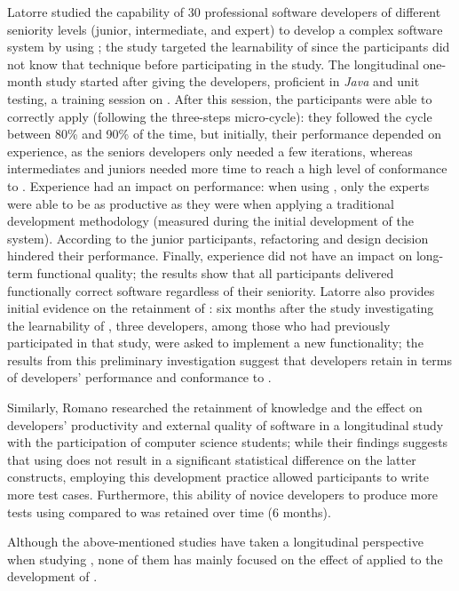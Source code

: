 Latorre \cite{DBLP:journals/tse/Latorre14} studied the capability of 30 professional software developers of different seniority levels (junior, intermediate, and expert) to develop a complex software system by using \tdd; the study targeted the learnability of \tdd since the participants did not know that technique before participating in the study. 
The longitudinal one-month study started after giving the developers, proficient in \textit{Java} and unit testing, a training session on \tdd. After this session, the participants were able to correctly apply \tdd (\eg following the three-steps micro-cycle): they followed the \tdd cycle between 80\% and 90\% of the time, but initially, their performance depended on experience, as the seniors developers only needed a few iterations, whereas intermediates and juniors needed more time to reach a high level of conformance to \tdd. 
Experience had an impact on performance: when using \tdd, only the experts were able to be as productive as they were when applying a traditional development methodology (measured during the initial development of the system). According to the junior participants, refactoring and design decision hindered their performance. Finally, experience did not have an impact on long-term functional quality; the results show that all participants delivered functionally correct software regardless of their seniority. 
Latorre \cite{DBLP:journals/tse/Latorre14} also provides initial evidence on the retainment of \tdd: six months after the study investigating the learnability of \tdd, three developers, among those who had previously participated in that study, were asked to implement a new functionality; the results from this preliminary investigation suggest that developers retain \tdd in terms of developers' performance and conformance to \tdd.

Similarly, Romano \etal \cite{DBLP:conf/esem/Fucci0BCSTJ18} researched the retainment of \tdd knowledge and the effect on developers' productivity and external quality of software in a longitudinal study with the participation of computer science students; while their findings suggests that using \tdd does not result in a significant statistical difference on the latter constructs, employing this development practice allowed participants to write more test cases. Furthermore, this ability of novice developers to produce more tests using \tdd compared to \notdd was retained over time (6 months).

Although the above-mentioned studies have taken a longitudinal perspective when studying \tdd, none of them has mainly focused on the effect of \tdd applied to the development of \ess.


